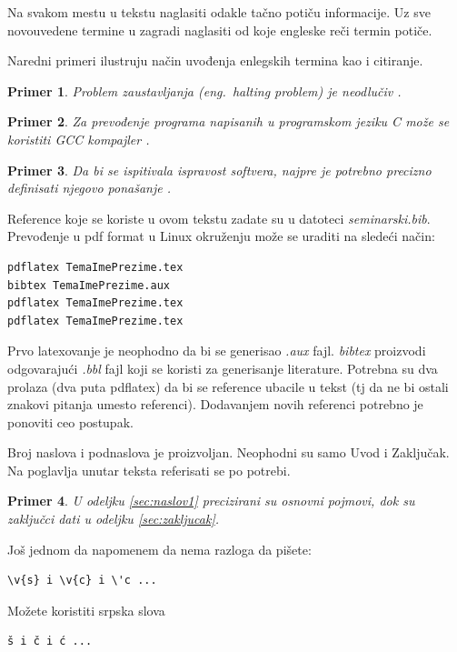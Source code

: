 \documentclass[a4paper]{article}
\newtheorem{primer}{Primer}[section]
\begin{document}
Na svakom mestu u tekstu naglasiti odakle tačno potiču informacije. Uz sve novouvedene termine u zagradi naglasiti od koje engleske reči termin potiče. 

Naredni primeri ilustruju način uvođenja enlegskih termina kao i citiranje.

\begin{primer}
Problem zaustavljanja (eng.~{\em halting problem}) je neodlučiv \cite{haltingproblem}.
\end{primer}

\begin{primer}
Za prevođenje programa napisanih u programskom jeziku C može se koristiti GCC kompajler \cite{gcc}.
\end{primer}

\begin{primer}
 Da bi se ispitivala ispravost softvera, najpre je potrebno precizno definisati njegovo ponašanje \cite{laski2009software}. 
\end{primer}

Reference koje se koriste u ovom tekstu zadate su u datoteci {\em seminarski.bib}. Prevođenje u pdf format u Linux okruženju može se uraditi na sledeći način:
\begin{verbatim}
pdflatex TemaImePrezime.tex 
bibtex TemaImePrezime.aux 
pdflatex TemaImePrezime.tex 
pdflatex TemaImePrezime.tex 
\end{verbatim}
Prvo latexovanje je neophodno da bi se generisao {\em .aux} fajl. {\em bibtex} proizvodi odgovarajući {\em .bbl} fajl koji se koristi za generisanje literature. 
Potrebna su dva prolaza (dva puta pdflatex) da bi se reference ubacile u tekst (tj da ne bi ostali znakovi pitanja umesto referenci). Dodavanjem novih referenci potrebno je ponoviti ceo postupak.  











Broj naslova i podnaslova je proizvoljan. Neophodni su samo Uvod i Zaključak. Na poglavlja unutar teksta referisati se po potrebi. 
\begin{primer}
U odeljku \ref{sec:naslov1} precizirani su osnovni pojmovi, dok su zaključci dati u odeljku \ref{sec:zakljucak}.
\end{primer}

Još jednom da napomenem da nema razloga da pišete:
\begin{verbatim}
\v{s} i \v{c} i \'c ...
\end{verbatim}
Možete koristiti srpska slova
\begin{verbatim}
š i č i ć ... 
\end{verbatim}
\end{document}
